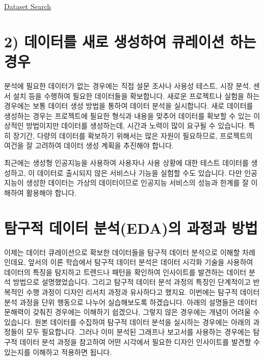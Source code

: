 \documentclass[
  letterpaper,
]{book}
\begin{document}
\href{https://datasetsearch.research.google.com}{Dataset Search}

\section{2) 데이터를 새로 생성하여 큐레이션 하는
경우}\label{uxb370uxc774uxd130uxb97c-uxc0c8uxb85c-uxc0dduxc131uxd558uxc5ec-uxd050uxb808uxc774uxc158-uxd558uxb294-uxacbduxc6b0}

분석에 필요한 데이터가 없는 경우에는 직접 설문 조사나 사용성 테스트,
시장 분석, 센서 설치 등을 수행하여 필요한 데이터들을 확보합니다. 새로운
프로젝트나 실험을 하는 경우에는 보통 데이터 생성 방법을 통하여 데이터
분석을 실시합니다. 새로 데이터를 생성하는 경우는 프로젝트에 필요한
형식과 내용을 맞추어 데이터를 확보할 수 있는 이상적인 방법이지만
데이터를 생성하는데, 시간과 노력이 많이 요구될 수 있습니다. 특히 장기간,
다량의 데이터를 확보하기 위해서는 많은 자원이 필요하므로, 프로젝트의
여건을 잘 고려하여 데이터 생성 계획을 추진해야 합니다.

최근에는 생성형 인공지능을 사용하여 사용자나 사용 상황에 대한 테스트
데이터를 생성하고, 이 데이터로 출시되지 않은 서비스나 기능을 실험할 수도
있습니다. 다만 인공지능이 생성한 데이터는 가상의 데이터이므로 인공지능
서비스의 성능과 한계를 잘 이해하여 활용해야 합니다.

\section{탐구적 데이터 분석(EDA)의 과정과
방법}\label{uxd0d0uxad6cuxc801-uxb370uxc774uxd130-uxbd84uxc11dedauxc758-uxacfcuxc815uxacfc-uxbc29uxbc95}

이제는 데이터 큐레이션으로 확보한 데이터들을 탐구적 데이터 분석으로
이해할 차례인데요, 앞서의 이론 학습에서 탐구적 데이터 분석은 데이터
시각화 기술을 사용하여 데이터의 특징을 탐지하고 트렌드나 패턴을 확인하여
인사이트를 발견하는 데이터 분석 방법으로 설명했었습니다. 그리고 탐구적
데이터 분석 과정의 특징인 단계적이고 반복적인 수행 과정이 디자인 리서치
과정과 유사하다고 했지요. 이번에는 탐구적 데이터 분석 과정을 단위
행동으로 나누어 실습해보도록 하겠습니다. 아래의 설명들은 데이터 문해력이
갖춰진 경우에는 이해하기 쉽겠으나, 그렇지 않은 경우에는 개념이 어려울 수
있습니다. 원본 데이터를 수집하여 탐구적 데이터 분석을 실시하는 경우에는
아래의 과정들이 모두 필요합니다. 그러나 이미 분석된 그래프나 보고서를
사용하는 경우에는 탐구적 데이터 분석 과정을 참고하여 어떤 시각에서
필요한 디자인 인사이트를 발견할 수 있는지를 이해하고 적용하면 됩니다.
\end{document}
